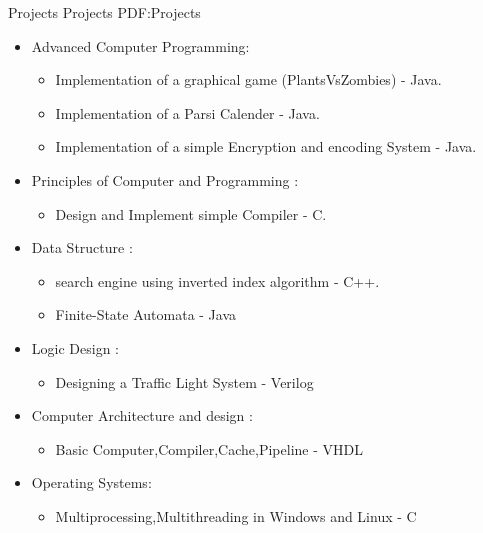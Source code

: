 \documentclass[letterpaper,MMMyyyy,nonstopmode]{simpleresumecv}
\begin{document}
\begin{Body}
\begin{itemize}
\end{itemize}



\Section
{Projects}
{Projects}
{PDF:Projects}

\Entry
\begin{itemize}

		
	\item Advanced Computer Programming:
		\begin{itemize}
		\item  Implementation of a graphical game (PlantsVsZombies) - Java.
     	\item Implementation of a Parsi Calender - Java.
	    \item Implementation of a simple Encryption and encoding System  - Java.
		\end{itemize}
		
	\item Principles of Computer and Programming : 
	    \begin{itemize}
	      \item Design and Implement simple Compiler - C.
	      \end{itemize}
	  \item Data Structure :
		\begin{itemize}
		\item	search engine using inverted index algorithm - C++.
	     \item   Finite-State Automata - Java
		\end{itemize}
   	\item Logic Design : 
   	    \begin{itemize}
   	    \item Designing a Traffic Light System - Verilog
   	    \end{itemize}
   	\item Computer Architecture and design :
   		\begin{itemize}
		\item Basic Computer,Compiler,Cache,Pipeline - VHDL
		\end{itemize}
		
     \item Operating Systems:
     \begin{itemize}
       \item Multiprocessing,Multithreading in Windows and Linux  - C
    	\end{itemize}	
	


\end{itemize}
\end{Body}
\end{document}
